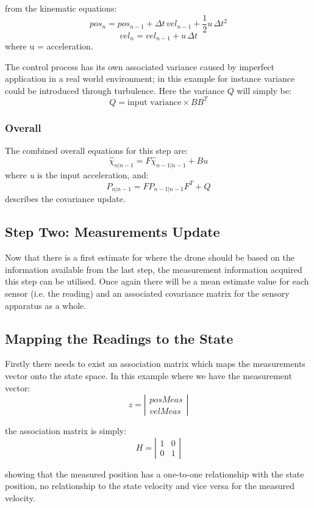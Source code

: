 from the kinematic equations:
\[pos_n = pos_{n-1} + \Delta t\, vel_{n-1} + \frac{1}{2} u\, \Delta t^2\]
\[vel_n = vel_{n-1} + u\, \Delta t\]
where u = acceleration.

The control process has its own associated variance caused by imperfect application in a real world environment; in this example for instance variance could be introduced through turbulence. Here the variance \(Q\) will simply be:
\[Q 
=
\textrm{input variance}
\times
BB^T\]

\subsubsection{Overall}
The combined overall equations for this step are:
\[\hat{\chi}_{n|n-1} = F\hat{\chi}_{n-1|n-1} + Bu\]
where \textit{u} is the input acceleration, and:
\[P_{n|n-1} = FP_{n-1|n-1}F^T + Q\]
describes the covariance update.

\subsection{Step Two: Measurements Update}
Now that there is a first estimate for where the drone should be based on the information available from the last step, the measurement information acquired this step can be utilised. Once again there will be a mean estimate value for each sensor (i.e. the reading) and an associated covariance matrix for the sensory apparatus as a whole. \par
\subsection{Mapping the Readings to the State}
	Firstly there needs to exist an association matrix which maps the measurements vector onto the state space. In this example where we have the measurement vector:
\[z 
=
\left |  \begin{array}{c}
posMeas \\
velMeas
\end{array}  \right |\]

the association matrix is simply:
\[H 
=
\left |  \begin{array}{cc}
1 & 0 \\
0 & 1
\end{array}  \right |\]

showing that the measured position has a one-to-one relationship with the state position, no relationship to the state velocity and vice versa for the measured velocity.\par

